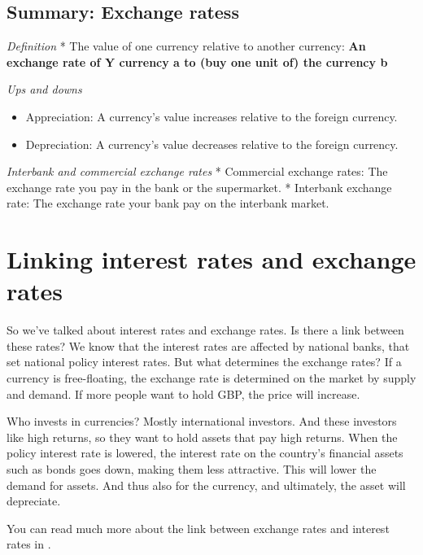 \documentclass[
]{book}
\providecommand{\tightlist}{%
  \setlength{\itemsep}{0pt}\setlength{\parskip}{0pt}}
\begin{document}
\hypertarget{summary-exchange-ratess}{%
\subsection*{Summary: Exchange ratess}\label{summary-exchange-ratess}}

\emph{Definition}
* The value of one currency relative to another currency: \textbf{An exchange rate of Y currency a to (buy one unit of) the currency b}

\emph{Ups and downs}

\begin{itemize}
\tightlist
\item
  Appreciation: A currency's value increases relative to the foreign currency.
\item
  Depreciation: A currency's value decreases relative to the foreign currency.
\end{itemize}

\emph{Interbank and commercial exchange rates}
* Commercial exchange rates: The exchange rate you pay in the bank or the supermarket.
* Interbank exchange rate: The exchange rate your bank pay on the interbank market.

\hypertarget{linking-interest-rates-and-exchange-rates}{%
\section{Linking interest rates and exchange rates}\label{linking-interest-rates-and-exchange-rates}}

So we've talked about interest rates and exchange rates. Is there a link between these rates? We know that the interest rates are affected by national banks, that set national policy interest rates. But what determines the exchange rates? If a currency is free-floating, the exchange rate is determined on the market by supply and demand. If more people want to hold GBP, the price will increase.

Who invests in currencies? Mostly international investors. And these investors like high returns, so they want to hold assets that pay high returns. When the policy interest rate is lowered, the interest rate on the country's financial assets such as bonds goes down, making them less attractive. This will lower the demand for assets. And thus also for the currency, and ultimately, the asset will depreciate.

You can read much more about the link between exchange rates and interest rates in \citep[chapter 15 in][]{core}.
\end{document}
